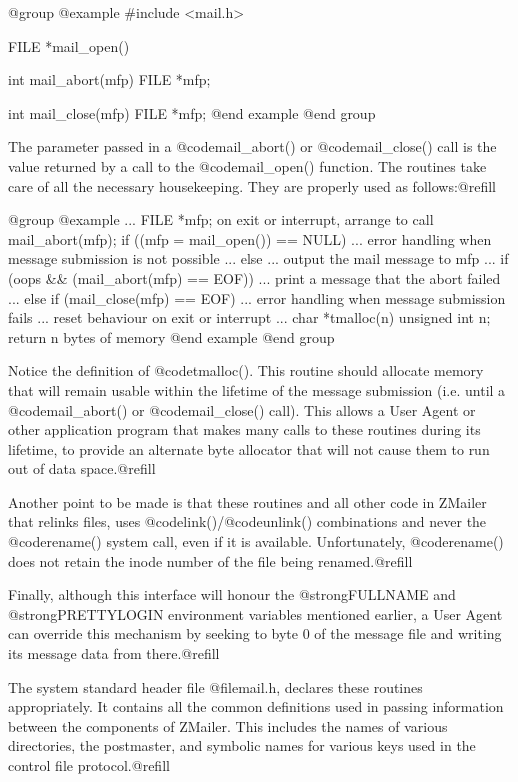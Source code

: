{{@group
@example
#include <mail.h>

FILE *mail_open()

int mail_abort(mfp)
FILE *mfp;

int mail_close(mfp)
FILE *mfp;
@end example
@end group

The parameter passed in a @code{mail_abort()} or @code{mail_close()} call is
the value returned by a call to the @code{mail_open()} function.
The routines take care of all the necessary housekeeping.
They are properly used as follows:@refill

@group
@example
...
FILE *mfp;
on exit or interrupt, arrange to call mail_abort(mfp);
if ((mfp = mail_open()) == NULL) {
    ... error handling when message submission is not possible ...
} else {
    ... output the mail message to mfp ...
    if (oops && (mail_abort(mfp) == EOF))
        ... print a message that the abort failed ...
    else if (mail_close(mfp) == EOF)
        ... error handling when message submission fails ...
}
reset behaviour on exit or interrupt
...
char *tmalloc(n) unsigned int n; { return n bytes of memory }
@end example
@end group

Notice the definition of @code{tmalloc()}.  This routine should allocate
memory that will remain usable within the lifetime of the message submission
(i.e. until a @code{mail_abort()} or @code{mail_close()} call).  This allows
a User Agent or other application program that makes many calls to these
routines during its lifetime, to provide an alternate byte allocator that
will not cause them to run out of data space.@refill

Another point to be made is that these routines and all other code in
ZMailer that relinks files, uses @code{link()}/@code{unlink()} combinations
and never the @code{rename()} system call, even if it is available.
Unfortunately, @code{rename()} does not retain the inode number of the
file being renamed.@refill

Finally, although this interface will honour the @strong{FULLNAME} and
@strong{PRETTYLOGIN} environment variables mentioned earlier, a User Agent
can override this mechanism by seeking to byte 0 of the message file and
writing its message data from there.@refill

The system standard header file @file{mail.h}, declares these routines
appropriately.  It contains all the common definitions used in passing
information between the components of ZMailer.  This includes the names
of various directories, the postmaster, and symbolic names for various
keys used in the control file protocol.@refill

}}
